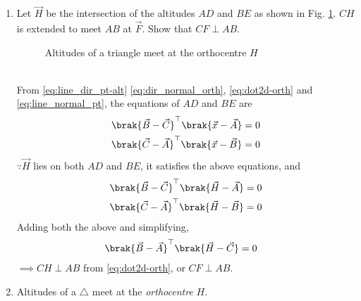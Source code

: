 \begin{enumerate}[label=\thesection.\arabic*.,ref=\thesection.\theenumi]
\item Let $\vec{H}$ be the intersection of the altitudes $AD$ and $BE$ as shown in Fig. \ref{fig:tri_alt_h}.  $CH$ is extended to meet $AB$ at $\vec{F}$.  Show that $CF \perp AB$.
%
\begin{figure}[!ht]
	\begin{center}
		\resizebox{\columnwidth}{!}{}
	\end{center}
	\caption{Altitudes of a triangle meet at the orthocentre $H$}
	\label{fig:tri_alt_h}	
\end{figure}
%
\\
\solution 
From \eqref{eq:line_dir_pt-alt}
\eqref{eq:dir_normal_orth},
  \eqref{eq:dot2d-orth}
and 
\eqref{eq:line_normal_pt},
the equations of $AD$ and $BE$ are 
%
\begin{align}
\brak{\vec{B}-\vec{C}}^{\top}\brak{\vec{x}-\vec{A}} &= 0  
\\
\brak{\vec{C}-\vec{A}}^{\top}\brak{\vec{x}-\vec{B}} &= 0  
\end{align}
%
 $\because \vec{H}$ lies on both $AD$ and $BE$, it satisfies the above equations, and 
%
\begin{align}
\brak{\vec{B}-\vec{C}}^{\top}\brak{\vec{H}-\vec{A}} &= 0  
\\
\brak{\vec{C}-\vec{A}}^{\top}\brak{\vec{H}-\vec{B}} &= 0  
\end{align}
%
Adding both the above and simplifying, 
%
\begin{align}
\brak{\vec{B}-\vec{A}}^{\top}\brak{\vec{H}-\vec{C}} &= 0  
\end{align}
%
$\implies CH \perp AB$ 
from   \eqref{eq:dot2d-orth}, or $CF \perp AB$.  
%
\iffalse
The python code for  Fig. \ref{fig:tri_alt_h} is
\begin{lstlisting}
codes/triangle/tri_alt_h.py
\end{lstlisting}
%
and the equivalent latex-tikz code is
%
\begin{lstlisting}
figs/triangle/tri_alt_h.tex
\end{lstlisting}
\fi
\item Altitudes of a $\triangle$ meet at the {\em orthocentre} $H$.
%
\end{enumerate}
